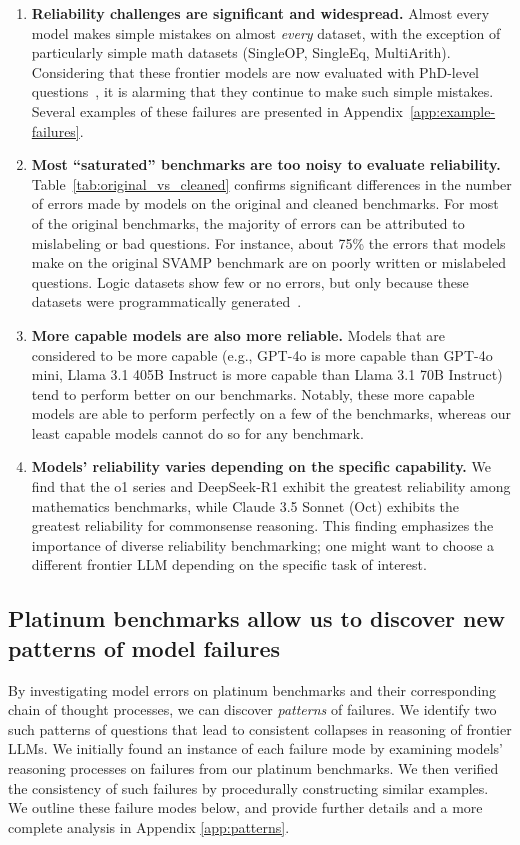 \begin{enumerate}
    \item \textbf{Reliability challenges are significant and widespread.} Almost every model makes simple mistakes on almost {\em every} dataset, with the exception of particularly simple math datasets (SingleOP, SingleEq, MultiArith). Considering that these frontier models are now evaluated with PhD-level questions~\cite{rein2023gpqa}, it is alarming that they continue to make such simple mistakes. Several examples of these failures are presented in Appendix~\ref{app:example-failures}.
    \item \textbf{Most ``saturated'' benchmarks are too noisy to evaluate reliability.} Table~\ref{tab:original_vs_cleaned} confirms significant differences in the number of errors made by models on the original and cleaned benchmarks. For most of the original benchmarks, the majority of errors can be attributed to mislabeling or bad questions. For instance, about 75\% the errors that models make on the original SVAMP benchmark are on poorly written or mislabeled questions. Logic datasets show few or no errors, but only because these datasets were programmatically generated~\cite{srivastava2022beyond}.

    \item \textbf{More capable models are also more reliable.} Models that are considered to be more capable (e.g., GPT-4o is more capable than GPT-4o mini, Llama 3.1 405B Instruct is more capable than Llama 3.1 70B Instruct) tend to perform better on our benchmarks. Notably, these more capable models are able to perform perfectly on a few of the benchmarks, whereas our least capable models cannot do so for any benchmark.

    \item \textbf{Models' reliability varies depending on the specific capability.} We find that the o1 series and DeepSeek-R1 exhibit the greatest reliability among mathematics benchmarks, while Claude 3.5 Sonnet (Oct) exhibits the greatest reliability for commonsense reasoning. This finding emphasizes the importance of diverse reliability benchmarking; one might want to choose a different frontier LLM depending on the specific task of interest.
\end{enumerate}


\subsection{Platinum benchmarks allow us to discover new patterns of model failures} 
By investigating model errors on platinum benchmarks and their corresponding chain of thought processes, we can discover \textit{patterns} of failures. We identify two such patterns of questions that lead to consistent collapses in reasoning of frontier LLMs. We initially found an instance of each failure mode by examining models' reasoning processes on failures from our platinum benchmarks. We then verified the consistency of such failures by procedurally constructing similar examples. We outline these failure modes below, and provide further details and a more complete analysis in Appendix \ref{app:patterns}.

